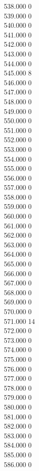 { 538.000	0 \\
 539.000	0 \\
 540.000	0 \\
 541.000	0 \\
 542.000	0 \\
 543.000	0 \\
 544.000	0 \\
 545.000	8 \\
 546.000	0 \\
 547.000	0 \\
 548.000	0 \\
 549.000	0 \\
 550.000	0 \\
 551.000	0 \\
 552.000	0 \\
 553.000	0 \\
 554.000	0 \\
 555.000	0 \\
 556.000	0 \\
 557.000	0 \\
 558.000	0 \\
 559.000	0 \\
 560.000	0 \\
 561.000	0 \\
 562.000	0 \\
 563.000	0 \\
 564.000	0 \\
 565.000	0 \\
 566.000	0 \\
 567.000	0 \\
 568.000	0 \\
 569.000	0 \\
 570.000	0 \\
 571.000	14 \\
 572.000	0 \\
 573.000	0 \\
 574.000	0 \\
 575.000	0 \\
 576.000	0 \\
 577.000	0 \\
 578.000	0 \\
 579.000	0 \\
 580.000	0 \\
 581.000	0 \\
 582.000	0 \\
 583.000	0 \\
 584.000	0 \\
 585.000	0 \\
 586.000	0 \\
}
